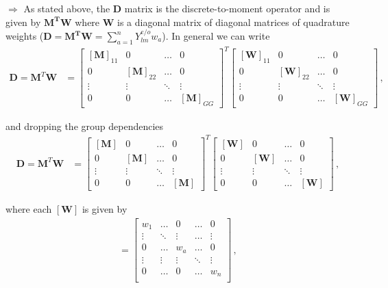 \documentclass[10pt]{article}
\begin{document}
$\Rightarrow$ As stated above, the $\textbf{D}$ matrix is the discrete-to-moment operator and is given by $\textbf{M}^\textbf{T}\textbf{W}$ where $\textbf{W}$ is a diagonal matrix of diagonal matrices of quadrature weights ($\textbf{D}=\textbf{M}^\textbf{T}\textbf{W}=\sum_{a=1}^n Y_{lm}^{e/o} w_a$). In general we can write
%
\begin{align*}
\textbf{D} = \textbf{M}^T\textbf{W} &=
\begin{bmatrix}
    [\textbf{M}]_{11} & 0 & \dots & 0  \\
    0 & [\textbf{M}]_{22} & \dots & 0  \\
    \vdots & \vdots & \ddots & \vdots \\
    0 & 0 & \dots & [\textbf{M}]_{GG}
\end{bmatrix} ^ T
\begin{bmatrix}
    [\textbf{W}]_{11} & 0 & \dots & 0  \\
    0 & [\textbf{W}]_{22} & \dots & 0  \\
    \vdots & \vdots & \ddots & \vdots \\
    0 & 0 & \dots & [\textbf{W}]_{GG}
\end{bmatrix}\,,
\end{align*}

and dropping the group dependencies 
%
\begin{align*}
\textbf{D} = \textbf{M}^T\textbf{W} &=
\begin{bmatrix}
    [\textbf{M}] & 0 & \dots & 0  \\
    0 & [\textbf{M}] & \dots & 0  \\
    \vdots & \vdots & \ddots & \vdots \\
    0 & 0 & \dots & [\textbf{M}]
\end{bmatrix} ^ T
\begin{bmatrix}
    [\textbf{W}] & 0 & \dots & 0  \\
    0 & [\textbf{W}] & \dots & 0  \\
    \vdots & \vdots & \ddots & \vdots \\
    0 & 0 & \dots & [\textbf{W}]
\end{bmatrix}\,,
\end{align*}

where each $[\textbf{W}]$ is given by
%
\begin{align*}
[\textbf{W}] = 
\begin{bmatrix}
    w_1 & \dots & 0 & \dots & 0  \\
    \vdots & \ddots & \vdots & \dots & \vdots   \\
    0 & \dots & w_a & \dots & 0 \\
     \vdots & \vdots & \vdots & \ddots & \vdots  \\
         0 & \dots & 0 &  \dots & w_n \\
\end{bmatrix}\,,
\end{align*}
\end{document}

